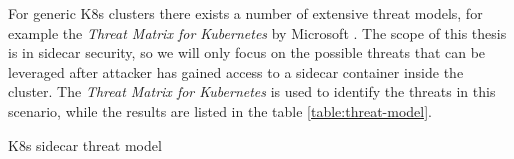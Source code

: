 \documentclass[english, 12pt, a4paper, sci, utf8, a-2b, online]{aaltothesis}
\begin{document}

For generic K8s clusters there exists a number of extensive threat models, for example the \textit{Threat Matrix for Kubernetes} by Microsoft \cite{k8s-threat-matrix}. The scope of this thesis is in sidecar security, so we will only focus on the possible threats that can be leveraged after attacker has gained access to a sidecar container inside the cluster. The \textit{Threat Matrix for Kubernetes} is used to identify the threats in this scenario, while the results are listed in the table \ref{table:threat-model}.

\begin{table}[H]
  \sffamily%
  \centering

  \caption{K8s sidecar threat model}
  \label{table:threat-model}


\end{table}
\end{document}
